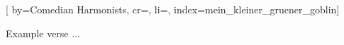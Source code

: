 
[%
    by={Comedian Harmonists},
    cr={},
    li={},
    index={mein_kleiner_gruener_goblin}]


    \label{mein_kleiner_gruener_goblin}

    \beginverse
        Example verse ...
    \endverse
\endsong
